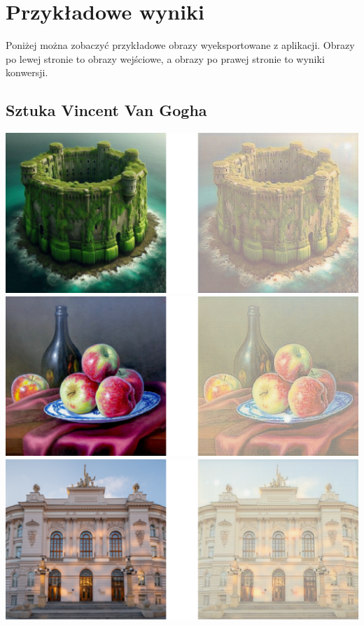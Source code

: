 \documentclass{article}
\begin{document}
\newpage

\section{Przykładowe wyniki}
Poniżej można zobaczyć przykładowe obrazy wyeksportowane z aplikacji. Obrazy po lewej stronie to obrazy wejściowe, a obrazy po prawej stronie to wyniki konwersji.

\subsection{Sztuka Vincent Van Gogha}
\includegraphics[width=\textwidth]{../imgs/side_by_side/v1.png}
\vspace{3mm} \\
\includegraphics[width=\textwidth]{../imgs/side_by_side/v2.png}
\vspace{3mm} \\
\includegraphics[width=\textwidth]{../imgs/side_by_side/v3.png}
\end{document}
